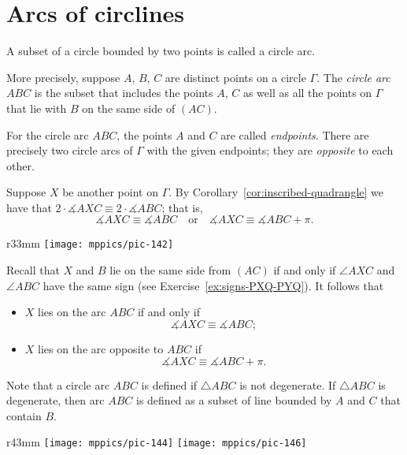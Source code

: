 \section*{Arcs of circlines}

A subset of a circle bounded by two points is called a circle arc.

More precisely,
suppose $A$, $B$, $C$ are distinct points on a circle $\Gamma$.
The \emph{circle arc}~$ABC$ is the subset that includes the points $A$, $C$
as well as all the points on $\Gamma$ that lie with $B$ on the same side of $(AC)$.

For the circle arc $ABC$, 
the points $A$ and $C$ are called 
\emph{endpoints}. 
There are precisely two circle arcs of $\Gamma$ with the given endpoints; they are \emph{opposite} to each other.

Suppose $X$ be another point on $\Gamma$.
By Corollary~\ref{cor:inscribed-quadrangle} we have
that $2\cdot\measuredangle AXC\equiv 2\cdot\measuredangle ABC$;
that is,
\[\measuredangle AXC\equiv\measuredangle ABC
\quad\text{or}\quad
\measuredangle AXC\equiv\measuredangle ABC+\pi.\]

\begin{wrapfigure}{r}{33mm}
\vskip-2mm
\centering
\texttt{[image: mppics/pic-142]}
\end{wrapfigure}

Recall that $X$ and $B$ lie on the same side from $(AC)$ if and only if $\angle AXC$ and $\angle ABC$ have the same sign (see Exercise~\ref{ex:signs-PXQ-PYQ}).
It follows that 
\begin{itemize}
\item $X$ lies on the arc $ABC$ if and only if 
\[\measuredangle AXC\equiv\measuredangle ABC;\]
\item $X$ lies on the arc opposite to $ABC$ if 
\[\measuredangle AXC\equiv\measuredangle ABC+\pi.\]
\end{itemize}

Note that a circle arc $ABC$ is defined if $\triangle ABC$ is not degenerate.
If $\triangle ABC$ is degenerate, then arc $ABC$ is defined as a subset of line bounded by $A$ and $C$ that contain $B$.


\begin{wrapfigure}{r}{43mm}
\vskip-2mm
\centering
\texttt{[image: mppics/pic-144]}
\vskip4mm
\texttt{[image: mppics/pic-146]}
\end{wrapfigure}

